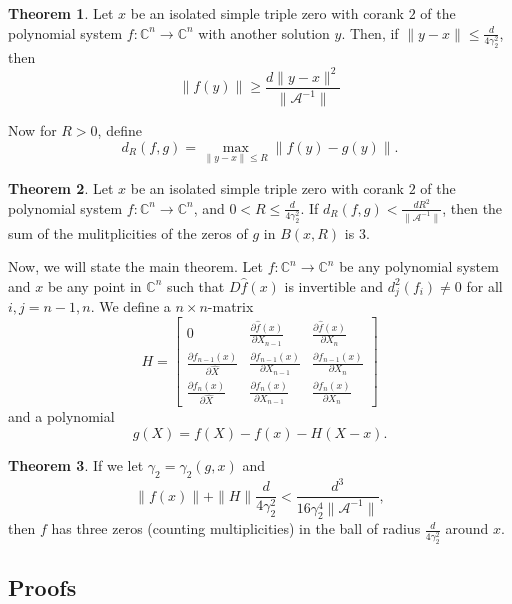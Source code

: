 \documentclass[12pt,oneside,reqno]{amsart}
\theoremstyle{definition}
\newtheorem{thm}{Theorem}
\newcommand{\CC}{\mathbb{C}}
\begin{document}
\begin{thm}\label{thm:lowerboundfy}
	Let $x$ be an isolated simple triple zero with corank $2$ of the polynomial system $f:\mathbb{C}^n\rightarrow \mathbb{C}^n$ with another solution $y$. Then, if $\|y-x\|\leq \frac{d}{4\gamma_2^2}$, then
	\[\left\|f(y)\right\|\geq \frac{d\|y-x\|^2}{\|\mathcal{A}^{-1}\|}\]
\end{thm}


Now for $R>0$, define
\begin{equation*}
d_R(f,g)=\max\limits_{\|y-x\|\leq R}\|f(y)-g(y)\|.
\end{equation*}
\begin{thm}\label{thm:multiplicityOfDiffSystem}
	Let $x$ be an isolated simple triple zero with corank $2$ of the polynomial system $f:\mathbb{C}^n\rightarrow\mathbb{C}^n$, and $0<R\leq \frac{d}{4\gamma_2^2}$. If $d_R(f,g)<\frac{dR^2}{\|\mathcal{A}^{-1}\|}$, then the sum of the mulitplicities of the zeros of $g$ in $B(x,R)$ is $3$.
\end{thm}

Now, we will state the main theorem. Let $f:\mathbb{C}^n\rightarrow\mathbb{C}^n$ be any polynomial system and $x$ be any point in $\CC^n$ such that $D\hat{f}(x)$ is invertible and $d_j^2(f_i)\ne 0$ for all $i,j=n-1,n$. We define a $n\times n$-matrix 
\[H=\begin{bmatrix}
0 & \frac{\partial\hat{f}(x)}{\partial X_{n-1}} & \frac{\partial\hat{f}(x)}{\partial X_{n}}\\
\frac{\partial f_{n-1}(x)}{\partial\hat{X}} & \frac{\partial f_{n-1}(x)}{\partial X_{n-1}} & \frac{\partial f_{n-1}(x)}{\partial X_{n}}\\
\frac{\partial f_{n}(x)}{\partial\hat{X}} & \frac{\partial f_{n}(x)}{\partial X_{n-1}} & \frac{\partial f_{n}(x)}{\partial X_{n}}
\end{bmatrix}\]
and a polynomial
\[g(X)= f(X)-f(x)-H(X-x).\]
\begin{thm}\label{thm:clusterthm}
	If we let $\gamma_2=\gamma_2(g,x)$ and \[\|f(x)\|+\|H\|\frac{d}{4\gamma_2^2}<\frac{d^3}{16\gamma_2^4\|\mathcal{A}^{-1}\|},\]
	then $f$ has three zeros (counting multiplicities) in the ball of radius $\frac{d}{4\gamma_2^2}$ around $x$.
\end{thm}
\subsection{Proofs}
\end{document}
